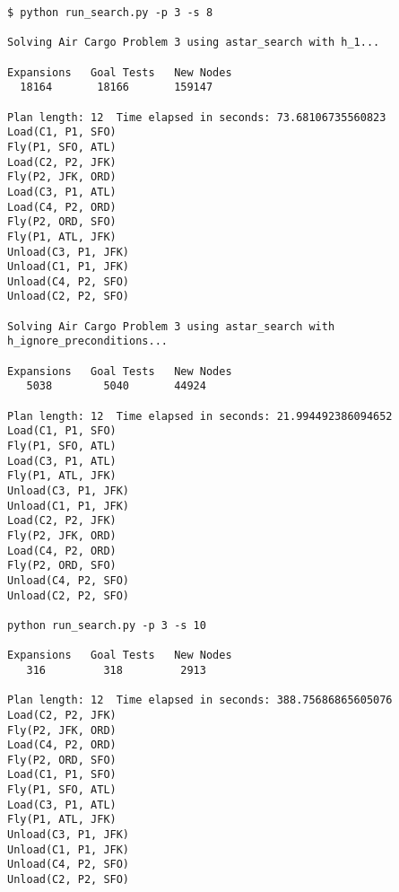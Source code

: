 \documentclass[11pt]{scrartcl}
\begin{document}
\begin{verbatim}
$ python run_search.py -p 3 -s 8

Solving Air Cargo Problem 3 using astar_search with h_1...

Expansions   Goal Tests   New Nodes
  18164       18166       159147

Plan length: 12  Time elapsed in seconds: 73.68106735560823
Load(C1, P1, SFO)
Fly(P1, SFO, ATL)
Load(C2, P2, JFK)
Fly(P2, JFK, ORD)
Load(C3, P1, ATL)
Load(C4, P2, ORD)
Fly(P2, ORD, SFO)
Fly(P1, ATL, JFK)
Unload(C3, P1, JFK)
Unload(C1, P1, JFK)
Unload(C4, P2, SFO)
Unload(C2, P2, SFO)

Solving Air Cargo Problem 3 using astar_search with h_ignore_preconditions...

Expansions   Goal Tests   New Nodes
   5038        5040       44924

Plan length: 12  Time elapsed in seconds: 21.994492386094652
Load(C1, P1, SFO)
Fly(P1, SFO, ATL)
Load(C3, P1, ATL)
Fly(P1, ATL, JFK)
Unload(C3, P1, JFK)
Unload(C1, P1, JFK)
Load(C2, P2, JFK)
Fly(P2, JFK, ORD)
Load(C4, P2, ORD)
Fly(P2, ORD, SFO)
Unload(C4, P2, SFO)
Unload(C2, P2, SFO)

python run_search.py -p 3 -s 10

Expansions   Goal Tests   New Nodes
   316         318         2913

Plan length: 12  Time elapsed in seconds: 388.75686865605076
Load(C2, P2, JFK)
Fly(P2, JFK, ORD)
Load(C4, P2, ORD)
Fly(P2, ORD, SFO)
Load(C1, P1, SFO)
Fly(P1, SFO, ATL)
Load(C3, P1, ATL)
Fly(P1, ATL, JFK)
Unload(C3, P1, JFK)
Unload(C1, P1, JFK)
Unload(C4, P2, SFO)
Unload(C2, P2, SFO)
\end{verbatim}
    
\end{document}
